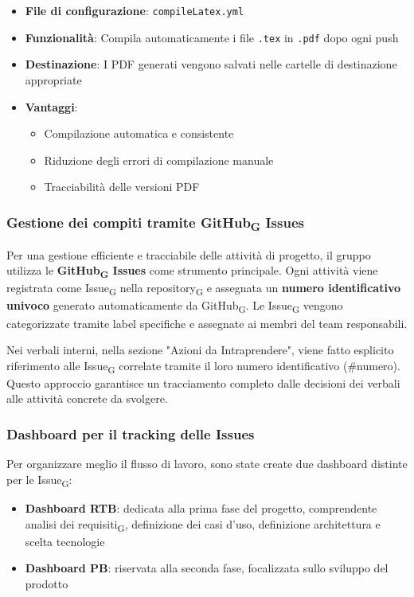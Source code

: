 \documentclass[11pt,a4paper]{article}
\newcommand{\gls}[1]{#1\textsubscript{G}}
\begin{document}
\begin{itemize}
    \item \textbf{File di configurazione}: \texttt{compileLatex.yml}
    \item \textbf{Funzionalità}: Compila automaticamente i file \texttt{.tex} in \texttt{.pdf} dopo ogni push
    \item \textbf{Destinazione}: I PDF generati vengono salvati nelle cartelle di destinazione appropriate
    \item \textbf{Vantaggi}:
    \begin{itemize}
        \item Compilazione automatica e consistente
        \item Riduzione degli errori di compilazione manuale
        \item Tracciabilità delle versioni PDF
    \end{itemize}
\end{itemize}

\subsubsection{Gestione dei compiti tramite \gls{GitHub} Issues}
Per una gestione efficiente e tracciabile delle attività di progetto, il gruppo utilizza le \textbf{\gls{GitHub} Issues} come strumento principale. Ogni attività viene registrata come \gls{Issue} nella \gls{repository} e assegnata un \textbf{numero identificativo univoco} generato automaticamente da \gls{GitHub}. Le \gls{Issue} vengono categorizzate tramite label specifiche e assegnate ai membri del team responsabili.

Nei verbali interni, nella sezione "Azioni da Intraprendere", viene fatto esplicito riferimento alle \gls{Issue} correlate tramite il loro numero identificativo (\#numero). Questo approccio garantisce un tracciamento completo dalle decisioni dei verbali alle attività concrete da svolgere.


\subsubsection{Dashboard per il tracking delle Issues}
Per organizzare meglio il flusso di lavoro, sono state create due dashboard distinte per le \gls{Issue}:
\begin{itemize}
    \item \textbf{Dashboard RTB}: dedicata alla prima fase del progetto, comprendente \gls{analisi dei requisiti}, definizione dei casi d'uso, definizione architettura e scelta tecnologie
    
    \item \textbf{Dashboard PB}: riservata alla seconda fase, focalizzata sullo sviluppo del prodotto
\end{itemize}
\end{document}
